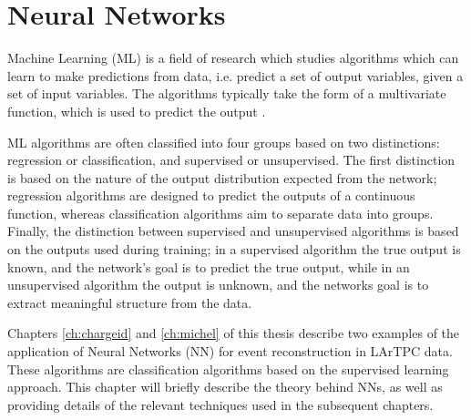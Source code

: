 \chapter{\label{ch:ml}Neural Networks} 

%
%
%
%

\minitoc

Machine Learning (ML) is a field of research which studies algorithms which 
can learn to make predictions from data, i.e. predict a set of output variables,
given a set of input variables. The algorithms typically take the form of a
multivariate function, which is used to predict the output \cite{Reed1999}.

ML algorithms are often classified into four groups based on two distinctions: 
regression or classification, and supervised or unsupervised. The first
distinction is based on the nature of the output distribution expected from the
network; regression algorithms are designed to predict the outputs of a 
continuous function, whereas classification algorithms aim to separate data 
into groups. Finally, the distinction between supervised and unsupervised 
algorithms is based on the outputs used during training; in a supervised 
algorithm the true output is known, and the network's goal is to predict the 
true output, while in an unsupervised algorithm the output is unknown, and the 
networks goal is to extract meaningful structure from the data.

Chapters \ref{ch:chargeid} and \ref{ch:michel} of this thesis describe two 
examples of the application of Neural Networks (NN) for event reconstruction 
in LArTPC data. These algorithms are classification algorithms based on the
supervised learning approach. This chapter will briefly describe the theory
behind NNs, as well as providing details of the relevant techniques used in 
the subsequent chapters.

